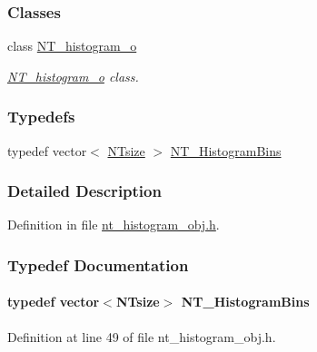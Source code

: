 \subsubsection*{Classes}
\begin{DoxyCompactItemize}
\item 
class \hyperlink{class_n_t__histogram__o}{NT\_\-histogram\_\-o}
\begin{DoxyCompactList}\small\item\em \hyperlink{class_n_t__histogram__o}{NT\_\-histogram\_\-o} class. \item\end{DoxyCompactList}\end{DoxyCompactItemize}
\subsubsection*{Typedefs}
\begin{DoxyCompactItemize}
\item 
typedef vector$<$ \hyperlink{nt__types_8h_a06c124f2e4469769b58230253ce0560b}{NTsize} $>$ \hyperlink{nt__histogram__obj_8h_abd1b6b9cf61f9298a255e21021f1bfc7}{NT\_\-HistogramBins}
\end{DoxyCompactItemize}


\subsubsection{Detailed Description}


Definition in file \hyperlink{nt__histogram__obj_8h_source}{nt\_\-histogram\_\-obj.h}.



\subsubsection{Typedef Documentation}
\paragraph[{NT\_\-HistogramBins}]{\setlength{\rightskip}{0pt plus 5cm}typedef vector$<${\bf NTsize}$>$ {\bf NT\_\-HistogramBins}}\hfill\label{nt__histogram__obj_8h_abd1b6b9cf61f9298a255e21021f1bfc7}


Definition at line 49 of file nt\_\-histogram\_\-obj.h.


